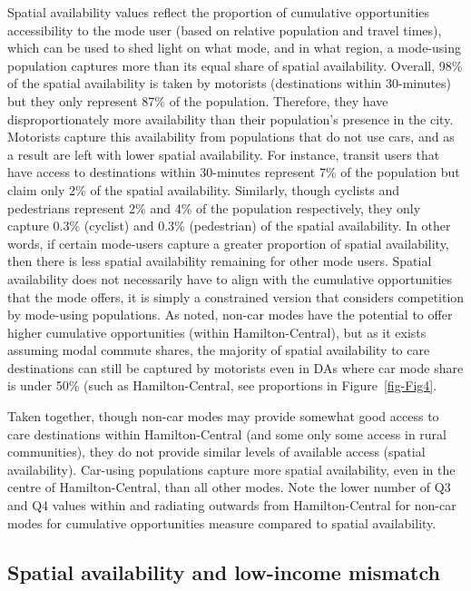 \documentclass[
  authoryear,
  preprint,
  3p]{elsarticle}
\begin{document}
Spatial availability values reflect the proportion of cumulative
opportunities accessibility to the mode user (based on relative
population and travel times), which can be used to shed light on what
mode, and in what region, a mode-using population captures more than its
equal share of spatial availability. Overall, 98\% of the spatial
availability is taken by motorists (destinations within 30-minutes) but
they only represent 87\% of the population. Therefore, they have
disproportionately more availability than their population's presence in
the city. Motorists capture this availability from populations that do
not use cars, and as a result are left with lower spatial availability.
For instance, transit users that have access to destinations within
30-minutes represent 7\% of the population but claim only 2\% of the
spatial availability. Similarly, though cyclists and pedestrians
represent 2\% and 4\% of the population respectively, they only capture
0.3\% (cyclist) and 0.3\% (pedestrian) of the spatial availability. In
other words, if certain mode-users capture a greater proportion of
spatial availability, then there is less spatial availability remaining
for other mode users. Spatial availability does not necessarily have to
align with the cumulative opportunities that the mode offers, it is
simply a constrained version that considers competition by mode-using
populations. As noted, non-car modes have the potential to offer higher
cumulative opportunities (within Hamilton-Central), but as it exists
assuming modal commute shares, the majority of spatial availability to
care destinations can still be captured by motorists even in DAs where
car mode share is under 50\% (such as Hamilton-Central, see proportions
in Figure~\ref{fig-Fig4}.

Taken together, though non-car modes may provide somewhat good access to
care destinations within Hamilton-Central (and some only some access in
rural communities), they do not provide similar levels of available
access (spatial availability). Car-using populations capture more
spatial availability, even in the centre of Hamilton-Central, than all
other modes. Note the lower number of Q3 and Q4 values within and
radiating outwards from Hamilton-Central for non-car modes for
cumulative opportunities measure compared to spatial availability.

\subsection{Spatial availability and low-income
mismatch}\label{spatial-availability-and-low-income-mismatch}
\end{document}
